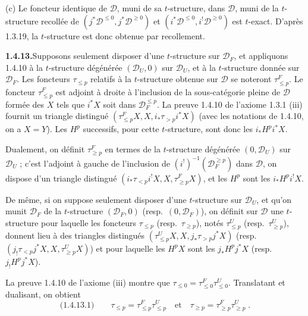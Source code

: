 \documentclass[12pt,a4paper]{article}
\theoremstyle{plain}
\theoremstyle{definition}
\begin{document}
(c) Le foncteur identique de $\mathcal{D}$, muni de sa $t$-structure, dans $\mathcal{D}$, muni de la $t$-structure recoll\'ee de $(j^*\mathcal{D}^{\leqslant 0}, j^*\mathcal{D}^{\geqslant 0})$ et $(i^*\mathcal{D}^{\leqslant 0}, i^!\mathcal{D}^{\geqslant 0})$ est $t$-exact. D'apr\`es 1.3.19, la $t$-structure est donc obtenue par recollement.

\smallskip
\noindent\textbf{1.4.13.}\quad Supposons seulement disposer d'une $t$-structure sur $\mathcal{D}_F$, et appliquons 1.4.10 \`a la $t$-structure d\'eg\'en\'er\'ee $(\mathcal{D}_U, 0)$ sur $\mathcal{D}_U$, et \`a la $t$-structure donn\'ee sur $\mathcal{D}_F$. Les foncteurs $\tau_{\leqslant p}$ relatifs \`a la $t$-structure obtenue sur $\mathcal{D}$ se noteront $\tau_{\leqslant p}^F$. Le foncteur $\tau_{\leqslant p}^F$ est adjoint \`a droite \`a l'inclusion de la sous-cat\'egorie pleine de $\mathcal{D}$ form\'ee des $X$ tels que $i^*X$ soit dans $\mathcal{D}_F^{\leqslant p}$. La preuve 1.4.10 de l'axiome 1.3.1 (iii) fournit un triangle distingu\'e $(\tau_{\leqslant p}^F X, X, i_*\tau_{>p}i^*X)$ (avec les notations de 1.4.10, on a $X = Y$). Les $H^p$ successifs, pour cette $t$-structure, sont donc les $i_*H^p i^*X$.

Dualement, on d\'efinit $\tau_{\geqslant p}^F$ en termes de la $t$-structure d\'eg\'en\'er\'ee $(0, \mathcal{D}_U)$ sur $\mathcal{D}_U$ ; c'est l'adjoint \`a gauche de l'inclusion de $(i^!)^{-1}(\mathcal{D}_F^{\geqslant p})$ dans $\mathcal{D}$, on dispose d'un triangle distingu\'e $(i_*\tau_{<p}i^!X, X, \tau_{\geqslant p}^F X)$, et les $H^p$ sont les $i_*H^p i^!X$.

De m\^eme, si on suppose seulement disposer d'une $t$-structure sur $\mathcal{D}_U$, et qu'on munit $\mathcal{D}_F$ de la $t$-structure $(\mathcal{D}_F, 0)$ (resp.\ $(0, \mathcal{D}_F)$), on d\'efinit sur $\mathcal{D}$ une $t$-structure pour laquelle les foncteurs $\tau_{\leqslant p}$ (resp.\ $\tau_{\geqslant p}$), not\'es $\tau_{\leqslant p}^U$ (resp.\ $\tau_{\geqslant p}^U$), donnent lieu \`a des triangles distingu\'es $(\tau_{\leqslant p}^U X, X, j_*\tau_{>p}j^*X)$ (resp.\ $(j_!\tau_{<p}j^*X, X, \tau_{\geqslant p}^U X)$) et pour laquelle les $H^p X$ sont les $j_*H^p j^*X$ (resp.\ $j_!H^p j^*X$).

La preuve 1.4.10 de l'axiome (iii) montre que $\tau_{\leqslant 0} = \tau_{\leqslant 0}^F \tau_{\leqslant 0}^U$. Translatant et dualisant, on obtient
\[
\text{(1.4.13.1)}\qquad \tau_{\leqslant p} = \tau_{\leqslant p}^F \tau_{\leqslant p}^U \quad\text{et}\quad \tau_{\geqslant p} = \tau_{\geqslant p}^F \tau_{\geqslant p}^U\;.
\]
\end{document}
